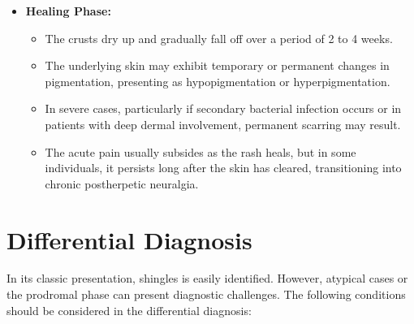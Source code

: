 \begin{itemize}
\begin{itemize}
        \item Pain remains a dominant feature. It is characterized as lancinating, stabbing, throbbing, or burning. Many patients experience extreme allodynia, where the lightest touch (such as clothing or a breeze) triggers severe pain. Hyperalgesia (an exaggerated response to painful stimuli) is also common.
    \end{itemize}
    \item \textbf{Healing Phase:}
    \begin{itemize}
        \item The crusts dry up and gradually fall off over a period of 2 to 4 weeks.
        \item The underlying skin may exhibit temporary or permanent changes in pigmentation, presenting as hypopigmentation or hyperpigmentation.
        \item In severe cases, particularly if secondary bacterial infection occurs or in patients with deep dermal involvement, permanent scarring may result.
        \item The acute pain usually subsides as the rash heals, but in some individuals, it persists long after the skin has cleared, transitioning into chronic postherpetic neuralgia.
    \end{itemize}
\end{itemize}

\section*{Differential Diagnosis}
In its classic presentation, shingles is easily identified. However, atypical cases or the prodromal phase can present diagnostic challenges. The following conditions should be considered in the differential diagnosis:


